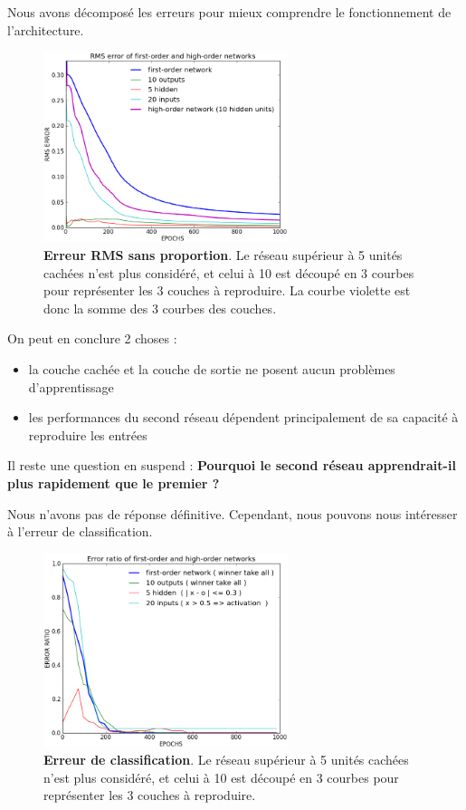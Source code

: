 \documentclass[a4paper,12pt, twoside]{article}
\begin{document}
Nous avons décomposé les erreurs pour mieux comprendre le fonctionnement de l'architecture.

\begin{figure}[H]
\begin{center}
 \includegraphics[width=270px]{../cleeremans_2007/digit_reco/rms_ffa.png}
\end{center}
\caption{ \textbf{Erreur RMS sans proportion}. Le réseau supérieur à 5 unités cachées n'est plus considéré, et celui à 
10 est découpé en 3 courbes pour représenter les 3 couches à reproduire. La courbe violette est donc la somme des 3 courbes des 
couches.}
\end{figure}

On peut en conclure 2 choses :
\begin{itemize}
 \item la couche cachée et la couche de sortie ne posent aucun problèmes d'apprentissage
 \item les performances du second réseau dépendent principalement de sa capacité à reproduire les entrées
\end{itemize}

Il reste une question en suspend :
\newline
\textbf{Pourquoi le second réseau apprendrait-il plus rapidement que le premier ?}

Nous n'avons pas de réponse définitive. Cependant, nous pouvons nous intéresser à l'erreur de classification.

\begin{figure}[H]
\begin{center}
 \includegraphics[width=270px]{../cleeremans_2007/digit_reco/err_ffa.png}
\end{center}
\caption{ \textbf{Erreur de classification}. Le réseau supérieur à 5 unités cachées n'est plus considéré, et celui à
10 est découpé en 3 courbes pour représenter les 3 couches à reproduire.}
\end{figure}
\end{document}
